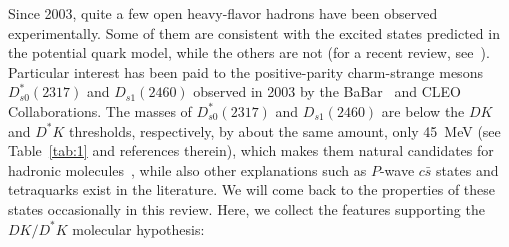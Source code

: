 Since 2003, quite a few {open heavy-flavor} hadrons have been observed
experimentally. Some of them are consistent with the excited states predicted in
the potential quark model, while the others are not (for a recent review,
see~\cite{Chen:2016spr}). Particular interest has been paid to the
positive-parity charm-strange mesons $D_{s0}^*(2317)$ and $D_{s1}(2460)$ observed
in 2003 by the BaBar~\cite{Aubert:2003fg} and CLEO~\cite{Besson:2003cp}
Collaborations.
The masses of $D_{s0}^*(2317)$ and $D_{s1}(2460)$ are below the $DK$ and $D^*K$
thresholds, respectively, by about the same amount, only 45~MeV (see
Table~\ref{tab:1} and references therein), which makes them natural candidates
for hadronic molecules~\cite{Barnes:2003dj,vanBeveren:2003kd,Szczepaniak:2003vy,
Kolomeitsev:2003ac,Hofmann:2003je,
Guo:2006fu,Guo:2006rp,Gamermann:2006nm,Faessler:2007gv,Flynn:2007ki,
Cleven:2010aw,Wu:2011yb,Cleven:2014oka, Albaladejo:2016hae}, while also other
explanations such as $P$-wave $c\bar s$ states and tetraquarks exist in the
literature.
We will come back to the properties of these states occasionally in this review.
Here, we collect the features supporting the $DK/D^*K$ molecular hypothesis:
